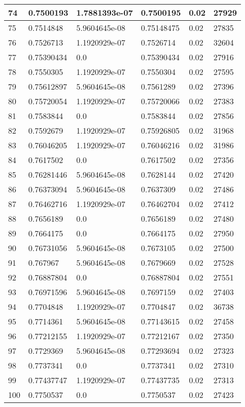 \begin{longtable}{|l|l|l|l|l|l|}
74 & 0.7500193 & 1.7881393e-07 & 0.7500195 & 0.02 & 27929 \\ \hline 
75 & 0.7514848 & 5.9604645e-08 & 0.75148475 & 0.02 & 27835 \\ \hline 
76 & 0.7526713 & 1.1920929e-07 & 0.7526714 & 0.02 & 32604 \\ \hline 
77 & 0.75390434 & 0.0 & 0.75390434 & 0.02 & 27916 \\ \hline 
78 & 0.7550305 & 1.1920929e-07 & 0.7550304 & 0.02 & 27595 \\ \hline 
79 & 0.75612897 & 5.9604645e-08 & 0.7561289 & 0.02 & 27396 \\ \hline 
80 & 0.75720054 & 1.1920929e-07 & 0.75720066 & 0.02 & 27383 \\ \hline 
81 & 0.7583844 & 0.0 & 0.7583844 & 0.02 & 27856 \\ \hline 
82 & 0.7592679 & 1.1920929e-07 & 0.75926805 & 0.02 & 31968 \\ \hline 
83 & 0.76046205 & 1.1920929e-07 & 0.76046216 & 0.02 & 31986 \\ \hline 
84 & 0.7617502 & 0.0 & 0.7617502 & 0.02 & 27356 \\ \hline 
85 & 0.76281446 & 5.9604645e-08 & 0.7628144 & 0.02 & 27420 \\ \hline 
86 & 0.76373094 & 5.9604645e-08 & 0.7637309 & 0.02 & 27486 \\ \hline 
87 & 0.76462716 & 1.1920929e-07 & 0.76462704 & 0.02 & 27412 \\ \hline 
88 & 0.7656189 & 0.0 & 0.7656189 & 0.02 & 27480 \\ \hline 
89 & 0.7664175 & 0.0 & 0.7664175 & 0.02 & 27950 \\ \hline 
90 & 0.76731056 & 5.9604645e-08 & 0.7673105 & 0.02 & 27500 \\ \hline 
91 & 0.767967 & 5.9604645e-08 & 0.7679669 & 0.02 & 27528 \\ \hline 
92 & 0.76887804 & 0.0 & 0.76887804 & 0.02 & 27551 \\ \hline 
93 & 0.76971596 & 5.9604645e-08 & 0.7697159 & 0.02 & 27403 \\ \hline 
94 & 0.7704848 & 1.1920929e-07 & 0.7704847 & 0.02 & 36738 \\ \hline 
95 & 0.7714361 & 5.9604645e-08 & 0.77143615 & 0.02 & 27458 \\ \hline 
96 & 0.77212155 & 1.1920929e-07 & 0.77212167 & 0.02 & 27350 \\ \hline 
97 & 0.7729369 & 5.9604645e-08 & 0.77293694 & 0.02 & 27323 \\ \hline 
98 & 0.7737341 & 0.0 & 0.7737341 & 0.02 & 27310 \\ \hline 
99 & 0.77437747 & 1.1920929e-07 & 0.77437735 & 0.02 & 27313 \\ \hline 
100 & 0.7750537 & 0.0 & 0.7750537 & 0.02 & 27423 \\ \hline 
\end{longtable}